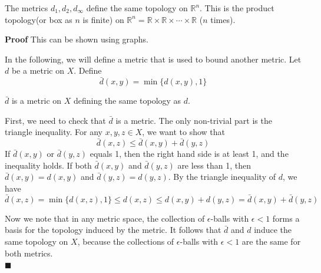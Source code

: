 \documentclass[main.tex]{subfiles}
\begin{document}
\begin{property}
    The metrics $d_1, d_2, d_{\infty}$ define the same topology on $\mathbb{R}^n$. This is the product topology(or box as $n$ is finite) on $\mathbb{R}^n = \mathbb{R} \times \mathbb{R} \times \cdots \times \mathbb{R}$ ($n$ times). 
\end{property}
\par \noindent \textbf{Proof} This can be shown using graphs. 
\par In the following, we will define a metric that is used to bound another metric. Let $d$ be a metric on $X$. Define
\begin{equation}
    \bar{d}(x, y) = \min\{d(x, y), 1\}
\end{equation}
\begin{theorem}
    $\bar{d}$ is a metric on $X$ defining the same topology as $d$.
\end{theorem}
\par First, we need to check that $\bar{d}$ is a metric. The only non-trivial part is the triangle inequality. For any $x, y, z \in X$, we want to show that
\begin{equation}
    \bar{d}(x, z) \leq \bar{d}(x, y) + \bar{d}(y, z)
\end{equation}
If $\bar{d}(x, y)$ or $\bar{d}(y, z)$ equals 1, then the right hand side is at least 1, and the inequality holds. If both $\bar{d}(x, y)$ and $\bar{d}(y, z)$ are less than 1, then $\bar{d}(x, y) = d(x, y)$ and $\bar{d}(y, z) = d(y, z)$. By the triangle inequality of $d$, we have
\begin{equation}
    \bar{d}(x, z) = \min\{d(x, z), 1\} \leq d(x, z) \leq d(x, y) + d(y, z) = \bar{d}(x, y) + \bar{d}(y, z)
\end{equation}
\par Now we note that in any metric space, the collection of $\epsilon$-balls with $\epsilon < 1$ forms a basis for the topology induced by the metric. It follows that $\bar{d}$ and $d$ induce the same topology on $X$, because the collections of $\epsilon$-balls with $\epsilon < 1$ are the same for both metrics.
\mbox{} \\ \null \hfill $\blacksquare$ 
\end{document}

